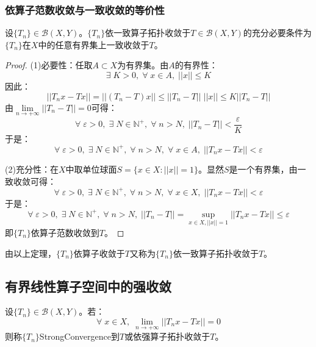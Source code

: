 \subsubsection{依算子范数收敛与一致收敛的等价性}
\begin{theorem}
	设$\{T_n\}\in\mathscr{B}(X,Y)$。$\{T_n\}$依一致算子拓扑收敛于$T\in\mathscr{B}(X,Y)$的充分必要条件为$\{T_n\}$在$X$中的任意有界集上一致收敛于$T$。
\end{theorem}
\begin{proof}
	(1)必要性：任取$A\subset X$为有界集。由$A$的有界性：
	\begin{equation*}
		\exists\;K>0,\;\forall\;x\in A,\;||x||\leqslant K
	\end{equation*}
	因此：
	\begin{equation*}
		||T_nx-Tx||=||(T_n-T)x||\leqslant||T_n-T||\;||x||\leqslant K||T_n-T||
	\end{equation*}
	由$\lim\limits_{n\to+\infty}||T_n-T||=0$可得：
	\begin{equation*}
		\forall\;\varepsilon>0,\;\exists\;N\in\mathbb{N}^+,\;\forall\;n>N,\;||T_n-T||<\frac{\varepsilon}{K}
	\end{equation*}
	于是：
	\begin{equation*}
		\forall\;\varepsilon>0,\;\exists\;N\in\mathbb{N}^+,\;\forall\;n>N,\;\forall\;x\in A,\;||T_nx-Tx||<\varepsilon
	\end{equation*}\par
	(2)充分性：在$X$中取单位球面$S=\{x\in X:||x||=1\}$。显然$S$是一个有界集，由一致收敛可得：
	\begin{equation*}
		\forall\;\varepsilon>0,\;\exists\;N\in\mathbb{N}^+,\;\forall\;n>N,\;\forall\;x\in X,\;||T_nx-Tx||<\varepsilon
	\end{equation*}
	于是：
	\begin{equation*}
		\forall\;\varepsilon>0,\;\exists\;N\in\mathbb{N}^+,\;\forall\;n>N,\;||T_n-T||=\sup_{x\in X,||x||=1}||T_nx-Tx||\leqslant\varepsilon
	\end{equation*}
	即$\{T_n\}$依算子范数收敛到$T$。
\end{proof}
由以上定理，$\{T_n\}$依算子收敛于$T$又称为$\{T_n\}$依一致算子拓扑收敛于$T$。

\subsection{有界线性算子空间中的强收敛}
\begin{definition}
	设$\{T_n\}\in\mathscr{B}(X,Y)$。若：
	\begin{equation*}
		\forall\;x\in X,\;\lim_{n\to+\infty}||T_nx-Tx||=0
	\end{equation*}
	则称$\{T_n\}$\gls{StrongConvergence}到$T$或依强算子拓扑收敛于$T$。
\end{definition}

